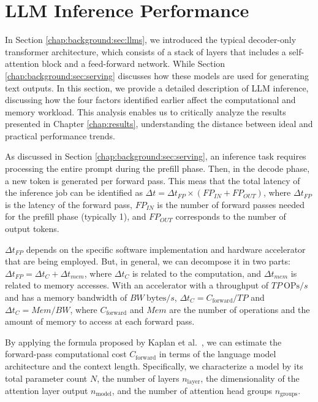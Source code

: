 \section{LLM Inference Performance}
\label{chap:methods:sec:model}

In Section \ref{chap:background:sec:llms}, we introduced the typical decoder-only transformer architecture, which consists of a stack of layers that includes a self-attention block and a feed-forward network. While Section \ref{chap:background:sec:serving} discusses how these models are used for generating text outputs. In this section, we provide a detailed description of LLM inference, discussing how the four factors identified earlier affect the computational and memory workload.
This analysis enables us to critically analyze the results presented in Chapter \ref{chap:results}, understanding the distance between ideal and practical performance trends.

As discussed in Section \ref{chap:background:sec:serving}, an inference task requires processing the entire prompt during the prefill phase. Then, in the decode phase, a new token is generated per forward pass.
This meas that the total latency of the inference job can be identified as $\Delta t = \Delta t_{FP} \times(FP_{IN} + FP_{OUT})$, where $\Delta t_{FP}$ is the latency of the forward pass, $FP_{IN}$ is the number of forward passes needed for the prefill phase (typically 1), and $FP_{OUT}$ corresponds to the number of output tokens.

$\Delta t_{FP}$ depends on the specific software implementation and hardware accelerator that are being employed. But, in general, we can decompose it in two parts: $\Delta t_{FP} = \Delta t_{C} + \Delta t_{mem}$, where $\Delta t_{C}$ is related to the computation, and $\Delta t_{mem}$ is related to memory accesses.
With an accelerator with a throughput of $TP\  \text{OPs}/s$ and has a memory bandwidth of $BW\ \text{bytes}/s$, $\Delta t_{C} = C_{\text{forward}}/TP$ and $\Delta t_{C} = Mem/BW$, where $C_{\text{forward}}$ and $Mem$ are the number of operations and the amount of memory to access at each forward pass. 

By applying the formula proposed by Kaplan et al.~\cite{kaplan2020scaling}, we can estimate the forward-pass computational cost \( C_{\text{forward}} \) in terms of the language model architecture and the context length. Specifically, we characterize a model by its total parameter count \( N \), the number of layers \( n_\text{layer} \), the dimensionality of the attention layer output \( n_\text{model} \), and the number of attention head groups $ n_\text{groups}$.

